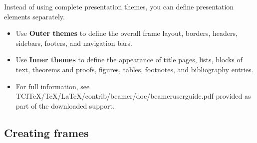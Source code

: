 \documentclass[notes=show,beamer]{beamer}
\begin{document}
\begin{frame}%


Instead of using complete presentation themes, you can define presentation
elements separately.

\begin{itemize}
\item Use \textbf{Outer themes }to define the overall frame layout, borders,
headers, sidebars, footers, and navigation bars.

\item Use \textbf{Inner themes }to define the appearance of title pages,
lists, blocks of text, theorems and proofs, figures, tables, footnotes, and
bibliography entries.

\item For full information, see
TCITeX/TeX/LaTeX/contrib/beamer/doc/beameruserguide.pdf provided as part of
the downloaded support.
\end{itemize}

\transboxout%
\end{frame}%

\subsection{Creating frames}
\end{document}
